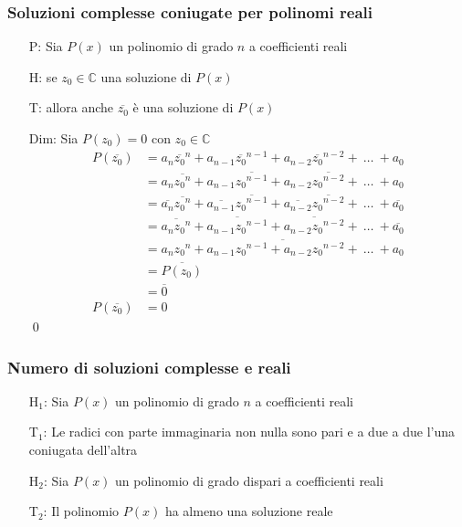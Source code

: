 \documentclass[a4paper]{article}
\begin{document}
\subsubsection*{Soluzioni complesse coniugate per polinomi reali}
\begin{itemize}
	\item[P: ] Sia \(P(x)\) un polinomio di grado \(n\) a coefficienti reali
	\item[H: ] se \(z_0 \in \mathbb{C}\) una soluzione di \(P(x)\)
	\item[T: ] allora anche \(\overline{z_0}\) è una soluzione di \(P(x)\)
	\item[Dim: ] Sia \(P(z_0) = 0\) con \(z_0 \in \mathbb{C}\)
	\begin{align*}
		P(\overline{z_0}) &= a_n \overline{z_0} ^ n + a_{n-1} \overline{z_0} ^ {n-1} + a_{n-2} \overline{z_0} ^ {n-2} + \  \dots \  + a_0 \\
		&= a_n \overline{{z_0} ^ n} + a_{n-1} \overline{{z_0} ^ {n-1}} + a_{n-2} \overline{{z_0} ^ {n-2}} + \  \dots \  + a_0 \\
		&= \overline{a_n} \overline{{z_0} ^ n} + \overline{a_{n-1}} \overline{{z_0} ^ {n-1}} + \overline{a_{n-2}} \overline{{z_0} ^ {n-2}} + \  \dots \  + \overline{a_0} \\
		&= \overline{a_n {z_0} ^ n} + \overline{a_{n-1} {z_0} ^ {n-1}} + \overline{a_{n-2} {z_0} ^ {n-2}} + \  \dots \  + \overline{a_0} \\
		&= \overline{a_n {z_0} ^ n + a_{n-1} {z_0} ^ {n-1} + a_{n-2} {z_0} ^ {n-2} + \  \dots \  + a_0} \\
		&= \overline{P(z_0)} \\
		&= \overline{0} \\
		P(\overline{z_0}) &= 0
	\end{align*}
	\qed
\end{itemize}

\subsubsection*{Numero di soluzioni complesse e reali}
\begin{itemize}
	\item[H\(_1\): ] Sia \(P(x)\) un polinomio di grado \(n\) a coefficienti reali
	\item[T\(_1\): ] Le radici con parte immaginaria non nulla sono pari e a due a due l'una coniugata dell'altra
	\item[H\(_2\): ] Sia \(P(x)\) un polinomio di grado dispari a coefficienti reali
	\item[T\(_2\): ] Il polinomio \(P(x)\) ha almeno una soluzione reale
\end{itemize}
\end{document}
